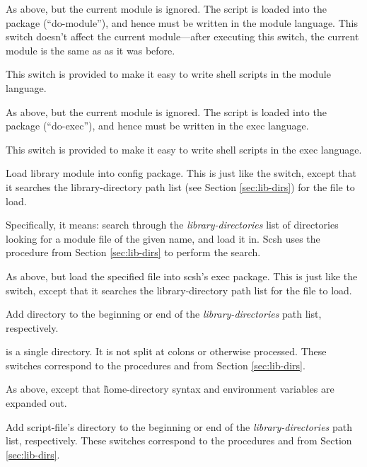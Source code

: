 \begin{itemize}
    As above, but the current module is ignored. The script is loaded into the
     package (``do-module''), and hence must be written in the
    {\scm} module language.
    This switch doesn't affect the current module---after executing this 
    switch, the current module is the same as as it was before.

    This switch is provided to make it easy to write shell scripts in the
    {\scm} module language.

    As above, but the current module is ignored. The script is loaded into the
     package (``do-exec''), and hence must be written in the
    {\scm} exec language.

    This switch is provided to make it easy to write shell scripts in the
    {\scm} exec language.


    Load library module into config package.
    This is just like the  switch, except that it searches the
    library-directory path list (see Section \ref{sec:lib-dirs}) 
    for the file to load.
    
    Specifically, it means: search through the
    \textit{library-directories} list of directories looking for a
    module file of the given name, and load it in. Scsh uses the
    procedure  from Section \ref{sec:lib-dirs}
    to perform the search.

    As above, but load the specified file into scsh's exec package.
    This is just like the  switch, except that it searches the
    library-directory path list for the file to load.

    Add directory  to the beginning or end of the
    \textit{library-directories} path list, respectively.
    
     is a single directory. It is not split at colons or
    otherwise processed. These switches correspond to the procedures
     and  from Section
    \ref{sec:lib-dirs}.

    As above, except that \~ home-directory syntax and environment
    variables are expanded out.
     
    Add script-file's directory to the beginning or end of the
    \textit{library-directories} path list, respectively. These switches 
    correspond to the procedures
     and  from Section
    \ref{sec:lib-dirs}.


\end{itemize}
